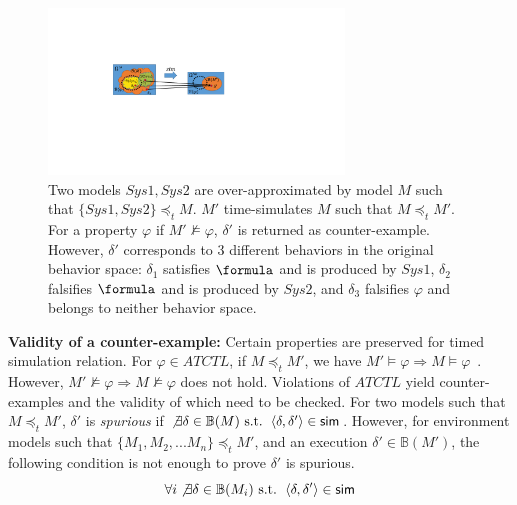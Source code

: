 \begin{figure}[!t]
		\centering
		\includegraphics[width=0.7\textwidth]{figs/SysVSEnv.pdf}
		\caption{\small Two models $Sys1,Sys2$ are over-approximated by model $M$ such that $\{Sys1,Sys2\}\preceq_t M$. $M'$ time-simulates $M$ such that $M\preceq_t M'$. For a property $\varphi$ if $M'\not\models\varphi$, $\delta'$ is returned as counter-example. However, $\delta'$ corresponds to 3 different behaviors in the original behavior space: $\delta_1$ satisfies $\formula$ and is produced by $Sys1$, $\delta_2$ falsifies $\formula$ and is produced by $Sys2$, and $\delta_3$ falsifies $\varphi$ and belongs to neither behavior space.}
		  \vspace{-15pt}
		\label{fig:ambiguity}
\end{figure}

\textbf{Validity of a counter-example: }
Certain properties are preserved for timed simulation relation. For $\varphi\in ATCTL$, if $M\preceq_t M'$, we have $M'\models \varphi\Rightarrow M\models\varphi$~\cite{CEGAR}. However, $M'\not\models \varphi\Rightarrow M\not\models\varphi$ does not hold. Violations of $ATCTL$ yield \textsf{counter-examples} and the validity of which need to be checked.
For two models such that $M\preceq_t M'$, $\delta'$ is \emph{spurious} if $\not\exists \delta\in\mathbb{B}(M) \text{ s.t. }\left\langle\delta,\delta'\right\rangle\in\textsf{sim}$.
However, for environment models such that $\{M_1,M_2,...M_n\}\preceq_t M'$, and an execution $\delta'\in\mathbb{B}(M')$, the following condition is not enough to prove $\delta'$ is spurious.
$$\forall i\not\exists \delta\in\mathbb{B}(M_i)\text{ s.t. }\left\langle\delta,\delta'\right\rangle\in\textsf{sim}$$
\vspace{-15pt}

